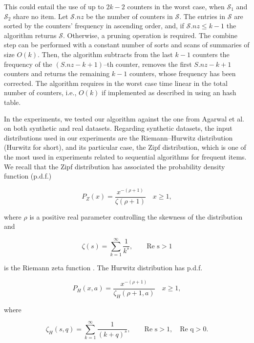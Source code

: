 \documentclass[final,3p,times]{elsarticle}
\begin{document}
 This could entail the use of up to $2k - 2$ counters in the worst case, when $\mathcal{S}_1$ and $\mathcal{S}_2$ share no item. Let $\mathcal{S}.nz$ be the number of counters in $\mathcal{S}$. The entries in $\mathcal{S}$ are sorted by the counters' frequency in ascending order, and, if $\mathcal{S}.nz \leq k-1$ the algorithm returns $\mathcal{S}$. Otherwise, a pruning operation is required. The combine step can be performed with a constant number of sorts and scans of summaries of size $O(k)$. Then, the algorithm subtracts from the last $k-1$ counters the frequency of the $(S.nz-k+1)$--th counter, removes the first $S.nz-k+1$ counters and returns the remaining $k - 1$ counters, whose frequency has been corrected. The algorithm requires in the worst case time linear in the total number of counters, i.e., $O(k)$ if implemented as described in \cite{Agarwal} using an hash table. 

In the experiments, we tested our algorithm against the one from Agarwal et al. on both synthetic and real datasets. Regarding synthetic datasets, the input distributions used in our experiments are the Riemann--Hurwitz distribution (Hurwitz for short), and its particular case, the Zipf distribution, which is one of the most used in experiments related to sequential algorithms for frequent items. We recall that the Zipf distribution has associated the probability density function (p.d.f.)

\begin{equation}
P_{Z}(x) = \frac{x^{-(\rho +1)}}{\zeta(\rho +1)}  \quad   x \geq 1,
\end{equation}

\noindent where $\rho$ is a positive real parameter controlling the skewness of the distribution and

\begin{equation}
\zeta(s)=\sum_{k=1}^{\infty} \frac{1}{k^{s}} , \qquad \text{Re s}>1
\end{equation}

\noindent is the Riemann zeta function \cite{iwaniec-kowalski}. The Hurwitz distribution has p.d.f.

\begin{equation}
\label{hd}
P_{H}(x, a) = \frac{x^{-(\rho +1)}}{\zeta_H(\rho +1,a)}  \quad   x \geq 1,
\end{equation}

\noindent where

\begin{equation}
\zeta_H(s, q)=\sum_{k=1}^{\infty} \frac{1}{(k+q)^{s}} , \qquad \text{Re s}>1, \quad \text{Re q} >0.
\end{equation}
\end{document}
